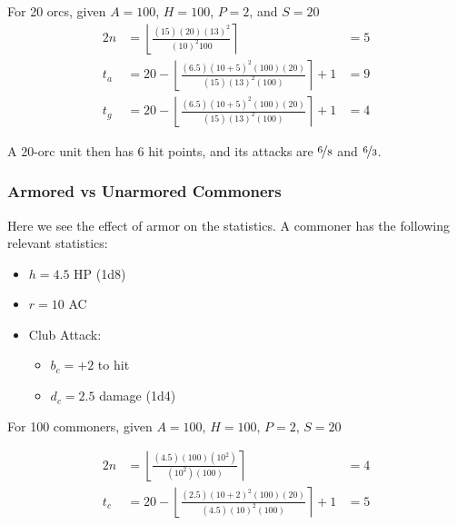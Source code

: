 For 20 orcs, given $A = 100$, $H = 100$, $P = 2$, and $S = 20$
\begin{alignat*}{2}
    n   &=
        \left\lfloor
            \frac
                {(15) (20) (13)^2}
                {(10)^2 100}
        \right\rceil
            &=  5
    \\
    t_a &=
        20 -
        \left\lfloor
            \frac
                {(6.5) (10 + 5)^2 (100) (20)}
                {(15) (13)^2 (100)}
        \right\rceil
        + 1
            &=   9
    \\
    t_g &=
        20 -
        \left\lfloor
            \frac
                {(6.5) (10 + 5)^2 (100) (20)}
                {(15) (13)^2 (100)}
        \right\rceil
        + 1
            &=  4
\end{alignat*}

A 20-orc unit then has 6 hit points, and its attacks are
$\nicefrac{6}{8}$ and $\nicefrac{6}{3}$.

\subsubsection{Armored vs Unarmored Commoners}

Here we see the effect of armor on the statistics.
A commoner has the following relevant statistics:

\begin{itemize}
    \item $h = 4.5$ HP (1d8)
    \item $r = 10$ AC
    \item Club Attack:
        \begin{itemize}
            \item $b_c = +2$ to hit
            \item $d_c = 2.5$ damage (1d4)
        \end{itemize}
\end{itemize}


For 100 commoners, given $A = 100$, $H = 100$, $P = 2$, $S = 20$

\begin{alignat*}{2}
    n   &=
        \left\lfloor
            \frac
                {(4.5) (100) (10^2)}
                {(10^2) (100)}
        \right\rceil
            &= 4
    \\
    t_c &=
        20 -
        \left\lfloor
            \frac
                {(2.5) (10 + 2)^2 (100) (20)}
                {(4.5) (10)^2 (100)}
        \right\rceil
        + 1
            &= 5
\end{alignat*}

